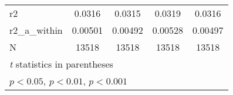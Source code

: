 {\begin{tabular}{l*{4}{c}}
\hline
r2          &      0.0316         &      0.0315         &      0.0319         &      0.0316         \\
r2\_a\_within &     0.00501         &     0.00492         &     0.00528         &     0.00497         \\
N           &       13518         &       13518         &       13518         &       13518         \\
\hline\hline
\multicolumn{5}{l}{\footnotesize \textit{t} statistics in parentheses}\\
\multicolumn{5}{l}{\footnotesize \sym{*} \(p<0.05\), \sym{**} \(p<0.01\), \sym{***} \(p<0.001\)}\\
\end{tabular}
}
